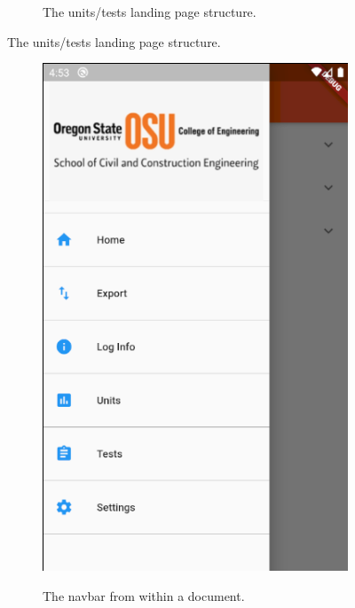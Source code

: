 \documentclass[onecolumn, draftclsnofoot,10pt, compsoc]{IEEEtran}
\begin{document}
\begin{figure}
\begin{subfigure}{.5\textwidth}
    \label{Fig 10.}
    \caption{ The units/tests landing page structure.}
\end{subfigure}
\end{figure}
\begin{figure}
\begin{subfigure}{.5\textwidth}
    \includegraphics[scale=0.5]{Images/navbar_inapp.png}
    \label{Fig 11.}
    \caption{ The navbar from within a document.}
\end{subfigure}
\begin{subfigure}{.5\textwidth}

\end{subfigure}
\end{figure}
\end{document}
